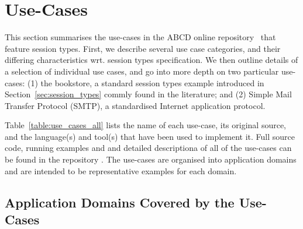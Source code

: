 
\section{Use-Cases}
\label{sec:usecases}

This section summarises the use-cases in the ABCD online repository~\cite{usecase_repository} that feature session types. First,  we describe several use case categories, and their differing characteristics wrt. session types specification.  We then outline details of a selection of individual use cases, and go into more depth on two particular use-cases: (1) the bookstore, a standard session types example introduced in Section~\ref{sec:session_types} commly found in the literature; and (2) Simple Mail Transfer Protocol (SMTP), a standardised Internet application protocol.

Table~\ref{table:use_cases_all} lists the name of each use-case, its original source, and the language(s) and tool(s) that have been used to implement it. Full source code, running examples and and detailed descriptiona of all of the use-cases can be found in the repository \cite{usecase_repository}.  The use-cases are organised into application domains and are intended to be representative examples for each domain.




\subsection{Application Domains Covered by the Use-Cases}

